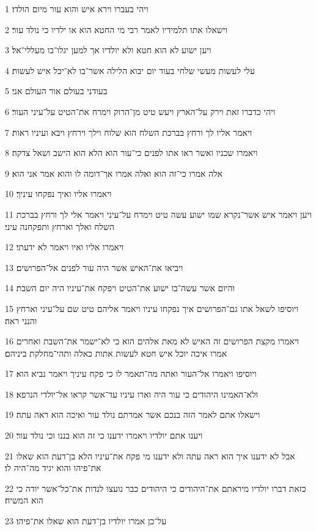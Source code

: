 \par 1 ויהי בעברו וירא איש והוא עור מיום הולדו׃
\par 2 וישאלו אתו תלמידיו לאמר רבי מי החטא הוא או ילדיו כי נולד עור׃
\par 3 ויען ישוע לא הוא חטא ולא יולדיו אך למען יגלו־בו מעללי־אל׃
\par 4 עלי לעשות מעשי שלחי בעוד יום יבוא הלילה אשר־בו לא־יכל איש לעשות׃
\par 5 בעודני בעולם אור העולם אני׃
\par 6 ויהי כדברו זאת וירק על־הארץ ויעש טיט מן־הרוק וימרח את־הטיט על־עיני העור׃
\par 7 ויאמר אליו לך ורחץ בברכת השלח הוא שלוח וילך וירחץ ויבא ועיניו ראות׃
\par 8 ויאמרו שכניו ואשר ראו אתו לפנים כי־עור הוא הלא הוא הישב ושאל צדקה׃
\par 9 אלה אמרו כי־זה הוא ואלה אמרו אך־דומה לו והוא אמר אני הוא׃
\par 10 ויאמרו אליו ואיך נפקחו עיניך׃
\par 11 ויען ויאמר איש אשר־נקרא שמו ישוע עשה טיט וימרח על־עיני ויאמר אלי לך ורחץ בברכת השלח ואלך וארחץ ותפקחנה עיני׃
\par 12 ויאמרו אליו ואיו ויאמר לא ידעתי׃
\par 13 ויביאו את־האיש אשר היה עור לפנים אל־הפרושים׃
\par 14 והיום אשר עשה־בו ישוע את־הטיט ויפקח את־עיניו היה יום השבת׃
\par 15 ויוסיפו לשאל אתו גם־הפרושים איך נפקחו עיניו ויאמר אליהם טיט שם על־עיני וארחץ והנני ראה׃
\par 16 ויאמרו מקצת הפרושים זה האיש לא מאת אלהים הוא כי לא־ישמר את־השבת ואחרים אמרו איכה יוכל איש חטא לעשות אתות כאלה ותהי־מחלקת ביניהם׃
\par 17 ויוסיפו ויאמרו אל־העור ואתה מה־תאמר לו כי פקח עיניך ויאמר נביא הוא׃
\par 18 ולא־האמינו היהודים כי עור היה וארו עיניו עד־אשר קראו אל־יולדי הנרפא׃
\par 19 וישאלו אתם לאמר הזה בנכם אשר אמרתם נולד עור ואיכה הוא ראה עתה׃
\par 20 ויענו אתם יולדיו ויאמרו ידענו כי זה הוא בננו וכי נולד עור׃
\par 21 אבל לא ידענו איך הוא ראה עתה ולא ידענו מי פקח את־עיניו הלא בן־דעת הוא שאלו את־פיהו והוא יגיד מה־היה לו׃
\par 22 כזאת דברו יולדיו מיראתם את־היהודים כי היהודים כבר נועצו לנדות את־כל־אשר יודה כי הוא המשיח׃
\par 23 על־כן אמרו יולדיו בן־דעת הוא שאלו את־פיהו׃
